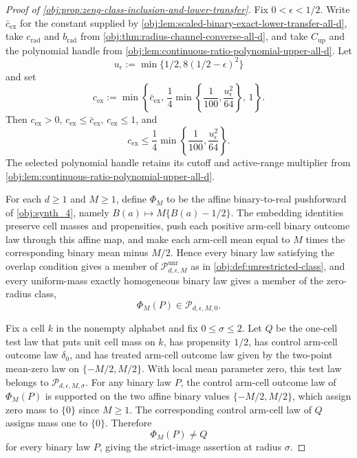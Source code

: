 \begin{proof}[Proof of \cref{obj:prop:zeng-class-inclusion-and-lower-transfer}]
Fix \(0<\epsilon<1/2\).  Write \(\bar c_{\mathrm{ex}}\) for the constant supplied by \cref{obj:lem:scaled-binary-exact-lower-transfer-all-d}, take \(c_{\mathrm{rad}}\) and \(b_{\mathrm{rad}}\) from \cref{obj:thm:radius-channel-converse-all-d}, and take \(C_{\mathrm{up}}\) and the polynomial handle from \cref{obj:lem:continuous-ratio-polynomial-upper-all-d}.  Let
\[
u_{
\epsilon}:=\min\{1/2,8(1/2-\epsilon)^2\}
\]
and set
\[
c_{\mathrm{ex}}
:=
\min\left\{
\bar c_{\mathrm{ex}},\,
\frac14\min\left\{\frac1{100},\frac{u_{\epsilon}^2}{64}\right\},\,
1
\right\}.
\]
Then \(c_{\mathrm{ex}}>0\), \(c_{\mathrm{ex}}\le \bar c_{\mathrm{ex}}\), \(c_{\mathrm{ex}}\le1\), and
\[
c_{\mathrm{ex}}\le
\frac14\min\left\{\frac1{100},\frac{u_{\epsilon}^2}{64}\right\}.
\]
The selected polynomial handle retains its cutoff and active-range multiplier from \cref{obj:lem:continuous-ratio-polynomial-upper-all-d}. %

For each \(d\ge1\) and \(M\ge1\), define \(\Phi_M\) to be the affine binary-to-real pushforward of \cref{obj:synth_4}, namely \(B(a)\mapsto M\{B(a)-1/2\}\).  The embedding identities preserve cell masses and propensities, push each positive arm-cell binary outcome law through this affine map, and make each arm-cell mean equal to \(M\) times the corresponding binary mean minus \(M/2\).  Hence every binary law satisfying the overlap condition gives a member of \(\mathcal P_{d,\epsilon,M}^{\mathrm{unr}}\) as in \cref{obj:def:unrestricted-class}, and every uniform-mass exactly homogeneous binary law gives a member of the zero-radius class,
\[
\Phi_M(P)\in\mathcal P_{d,\epsilon,M,0}.
\]

Fix a cell \(k\) in the nonempty alphabet and fix \(0\le\sigma\le2\).  Let \(Q\) be the one-cell test law that puts unit cell mass on \(k\), has propensity \(1/2\), has control arm-cell outcome law \(\delta_0\), and has treated arm-cell outcome law given by the two-point mean-zero law on \(\{-M/2,M/2\}\).  With local mean parameter zero, this test law belongs to \(\mathcal P_{d,\epsilon,M,\sigma}\).  For any binary law \(P\), the control arm-cell outcome law of \(\Phi_M(P)\) is supported on the two affine binary values \(\{-M/2,M/2\}\), which assign zero mass to \(\{0\}\) since \(M\ge1\).  The corresponding control arm-cell law of \(Q\) assigns mass one to \(\{0\}\).  Therefore
\[
\Phi_M(P)\ne Q
\]
for every binary law \(P\), giving the strict-image assertion at radius \(\sigma\). %


\end{proof}
